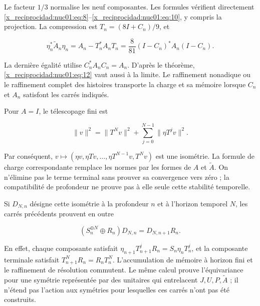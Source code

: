 Le facteur \(1/3\) normalise les neuf composantes. Les formules vérifient directement \eqref{x_reciprocidad:nuc01:eq:8}–\eqref{x_reciprocidad:nuc01:eq:10}, y compris la projection. La compression est \(T_n=(8I+C_n)/9\), et

\begin{equation}
\eta_n^*\widetilde A_n\eta_n
=A_n-T_n^*A_nT_n
=\frac8{81}(I-C_n)^*A_n(I-C_n).
\label{x_reciprocidad:nuc01:eq:12}
\end{equation}

La dernière égalité utilise \(C_n^*A_nC_n=A_n\). D’après le théorème, \eqref{x_reciprocidad:nuc01:eq:12} vaut aussi à la limite. Le raffinement nonadique ou le raffinement complet des histoires transporte la charge et sa mémoire lorsque \(C_n\) et \(A_n\) satisfont les carrés indiqués.

Pour \(A=I\), le télescopage fini est

\[
\|v\|^2=\|T^Nv\|^2+\sum_{j=0}^{N-1}\|\eta T^jv\|^2.
\]

Par conséquent, \(v\mapsto(\eta v,\eta Tv,\ldots,\eta T^{N-1}v,T^Nv)\) est une isométrie. La formule de charge correspondante remplace les normes par les formes de \(A\) et \(\widetilde A\). On n’élimine pas le terme terminal sans prouver sa convergence vers zéro ; la compatibilité de profondeur ne prouve pas à elle seule cette stabilité temporelle.

Si \(D_{N,n}\) désigne cette isométrie à la profondeur \(n\) et à l’horizon temporel \(N\), les carrés précédents prouvent en outre

\[
(S_n^{\oplus N}\oplus R_n)D_{N,n}
=D_{N,n+1}R_n.
\]

En effet, chaque composante satisfait \(\eta_{n+1}T_{n+1}^jR_n=S_n\eta_nT_n^j\), et la composante terminale satisfait \(T_{n+1}^NR_n=R_nT_n^N\). L’accumulation de mémoire à horizon fini et le raffinement de résolution commutent. Le même calcul prouve l’équivariance pour une symétrie représentée par des unitaires qui entrelacent \(J,U,P,\widetilde A\) ; il n’étend pas l’action aux symétries pour lesquelles ces carrés n’ont pas été construits.
